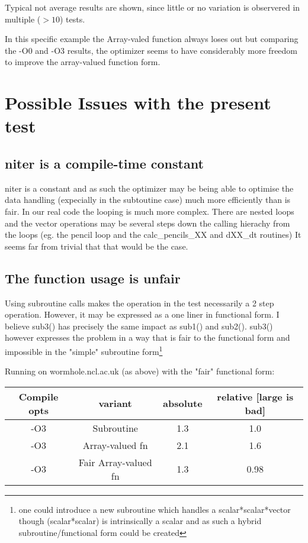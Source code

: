 \documentclass[a4paper,twoside,11pt]{article}
\begin{document}
Typical not average results are shown, since little or no variation 
is observered in multiple ($> 10$) tests.

In this specific example the Array-valed function always loses out but
comparing the -O0 and -O3 results, the optimizer seems to have considerably 
more freedom to improve the array-valued function form.

\chapter{Possible Issues with the present test}
\section{niter is a compile-time constant}
niter is a constant and as such the optimizer may be being able to optimise
the data handling (expecially in the subtoutine case) much more efficiently
than is fair.  In our real code the looping is much more complex.  There are
nested loops and the vector operations may be several steps down the calling
hierachy from the loops  (eg. the pencil loop and the calc\_pencils\_XX and
dXX\_dt routines)
It seems far from trivial that that would be the case.

\section{The function usage is unfair}
Using subroutine calls makes the operation in the test necessarily a 2 step
operation.  However, it may be expressed as a one liner in functional form.
I believe sub3() has precisely the same impact as sub1() and
sub2().  sub3() however expresses the problem in a way that is fair
to the functional form and impossible in the "simple" subroutine
form\footnote{one could introduce a new subroutine which handles a
scalar*scalar*vector though (scalar*scalar) is intrinsically a
scalar and as such a hybrid subroutine/functional form could be created}

Running on wormhole.ncl.ac.uk (as above) with the "fair" functional form:

\begin{tabular}{cccc}
   Compile opts     &       variant       &     absolute & relative [large is bad] \\
\hline
   -O3     &  Subroutine            &    1.3    &   1.0 \\
   -O3     &  Array-valued fn       &    2.1    &   1.6 \\
   -O3     &  Fair Array-valued fn  &    1.3    &   0.98 \\
\hline
\end{tabular}
\end{document}
